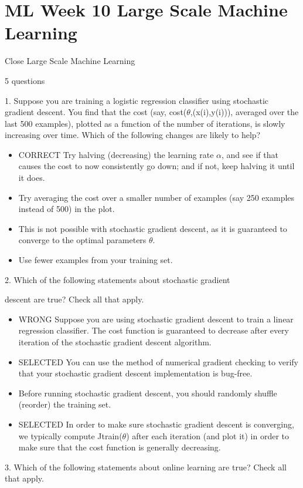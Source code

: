 \documentclass[11pt]{article} %
\begin{document}
\section*{ML Week 10 Large Scale Machine Learning}

Close
Large Scale Machine Learning

5 questions

1. 
Suppose you are training a logistic regression classifier using stochastic gradient descent. You find that the cost (say, cost($\theta$,(x(i),y(i))), averaged over the last 500 examples), plotted as a function of the number of iterations, is slowly increasing over time. Which of the following changes are likely to help?

\begin{itemize}
\item CORRECT  Try halving (decreasing) the learning rate $\alpha$, and see if that causes the cost to now consistently go down; and if not, keep halving it until it does.

\item Try averaging the cost over a smaller number of examples (say 250 examples instead of 500) in the plot.

\item This is not possible with stochastic gradient descent, as it is guaranteed to converge to the optimal parameters $\theta$.

\item Use fewer examples from your training set.
\end{itemize}

2. 
Which of the following statements about stochastic gradient

descent are true? Check all that apply.

\begin{itemize}
\item WRONG Suppose you are using stochastic gradient descent to train a linear regression classifier. The cost function  is guaranteed to decrease after every iteration of the stochastic gradient descent algorithm.
\item 
SELECTED You can use the method of numerical gradient checking to verify that your stochastic gradient descent implementation is bug-free. 
\item
Before running stochastic gradient descent, you should randomly shuffle (reorder) the training set.
\item 
SELECTED In order to make sure stochastic gradient descent is converging, we typically compute Jtrain($\theta$) after each iteration (and plot it) in order to make sure that the cost function is generally decreasing.
\end{itemize}
3. 
Which of the following statements about online learning are true? Check all that apply.
\end{document}
